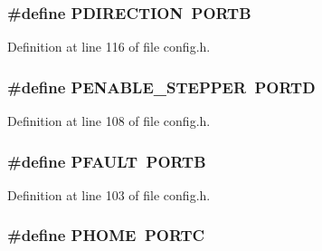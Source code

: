 \hypertarget{group__biba__config_ga27c908eae571c75c5a5e37d6fcc8db9d}{
\subsubsection[{P\-D\-I\-R\-E\-C\-T\-I\-O\-N}]{\setlength{\rightskip}{0pt plus 5cm}\#define P\-D\-I\-R\-E\-C\-T\-I\-O\-N~P\-O\-R\-T\-B}}\label{group__biba__config_ga27c908eae571c75c5a5e37d6fcc8db9d}


Definition at line 116 of file config.\-h.

\hypertarget{group__biba__config_gaf49566bede8af55a9c7c7cb49722ca8a}{
\subsubsection[{P\-E\-N\-A\-B\-L\-E\-\_\-\-S\-T\-E\-P\-P\-E\-R}]{\setlength{\rightskip}{0pt plus 5cm}\#define P\-E\-N\-A\-B\-L\-E\-\_\-\-S\-T\-E\-P\-P\-E\-R~P\-O\-R\-T\-D}}\label{group__biba__config_gaf49566bede8af55a9c7c7cb49722ca8a}


Definition at line 108 of file config.\-h.

\hypertarget{group__biba__config_gae646a630dc8c353cefb0a13c0fbe4a09}{
\subsubsection[{P\-F\-A\-U\-L\-T}]{\setlength{\rightskip}{0pt plus 5cm}\#define P\-F\-A\-U\-L\-T~P\-O\-R\-T\-B}}\label{group__biba__config_gae646a630dc8c353cefb0a13c0fbe4a09}


Definition at line 103 of file config.\-h.

\hypertarget{group__biba__config_ga431ab20bf2b9e58830a8ecd2a294e8bc}{
\subsubsection[{P\-H\-O\-M\-E}]{\setlength{\rightskip}{0pt plus 5cm}\#define P\-H\-O\-M\-E~P\-O\-R\-T\-C}}\label{group__biba__config_ga431ab20bf2b9e58830a8ecd2a294e8bc}


